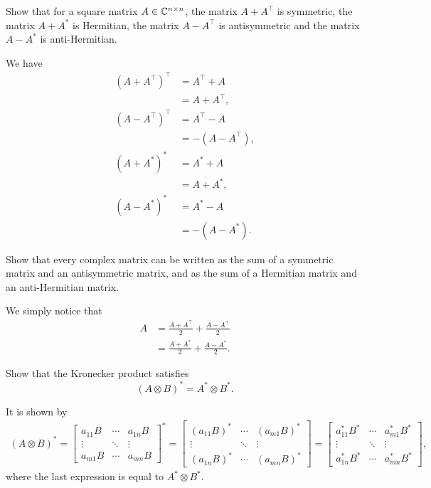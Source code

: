 Show that for a square matrix \(A \in \mathbb{C}^{n \times n}\), the matrix \(A + A^\top\) is symmetric, the matrix \(A + A^*\) is Hermitian, the matrix \(A - A^\top\) is antisymmetric and the matrix \(A - A^*\) is anti-Hermitian.

\begin{solution}
  We have
  \begin{align*}
    (A + A^\top)^\top & = A^\top + A\\
                & = A + A^\top,\\
    (A - A^\top)^\top & = A^\top - A\\
                & = -(A - A^\top),\\
    (A + A^*)^* & = A^* + A\\
                & = A + A^*,\\
    (A - A^*)^* & = A^* - A\\
                & = -(A - A^*).
  \end{align*}
\end{solution}

Show that every complex matrix can be written as the sum of a symmetric matrix and an antisymmetric matrix, and as the sum of a Hermitian matrix and an anti-Hermitian matrix.

\begin{solution}
  We simply notice that
  \begin{align*}
    A & = \frac{A + A^\top}{2} + \frac{A - A^\top}{2}\\
      & = \frac{A + A^*}{2} + \frac{A - A^*}{2}.
  \end{align*}
\end{solution}

Show that the Kronecker product satisfies
\[
(A \otimes B)^* = A^* \otimes B^*.
\]

\begin{solution}
  It is shown by
  \begin{align*}
    (A \otimes B)^* =
    \begin{bmatrix}
      a_{11}B & \cdots & a_{1n}B\\
      \vdots  & \ddots & \vdots\\
      a_{m1}B & \cdots & a_{mn}B
    \end{bmatrix}^* =
    \begin{bmatrix}
      (a_{11}B)^* & \cdots & (a_{m1}B)^*\\
      \vdots  & \ddots & \vdots\\
      (a_{1n}B)^* & \cdots & (a_{mn}B)^*
    \end{bmatrix} =
    \begin{bmatrix}
      a_{11}^*B^* & \cdots & a_{m1}^*B^*\\
      \vdots  & \ddots & \vdots\\
      a_{1n}^*B^* & \cdots & a_{mn}^*B^*
    \end{bmatrix},
  \end{align*}
  where the last expression is equal to \(A^* \otimes B^*\).
\end{solution}

